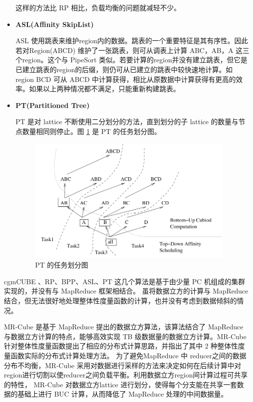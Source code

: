 \begin{itemize}
这样的方法比 RP 相比，负载均衡的问题就减轻不少。

\item \textbf{ASL(Affinity SkipList)}

ASL 使用跳表来维护region内的数据。跳表的一个重要特征是其有序性。因此若对Region(ABCD) 维护了一张跳表，则可从调表上计算 ABC，AB，A 这三个region。这个与 PipeSort 类似。若要计算的region并没有建立跳表，但它是已建立跳表的region的后缀，则仍可从已建立的跳表中较快速地计算。如region BCD 可从 ABCD 中计算获得，相比从原数据中计算获得有更高的效率。如果以上两种情况都不满足，只能重新构建跳表。
 
\item \textbf{PT(Partitioned Tree)}

PT 是对 lattice 不断使用二分划分的方法，直到划分的子 lattice 的数量与节点数量相同则停止。图 \ref{cluster_pt} 是 PT 的任务划分图。

\begin{figure}[!htb]
\centering\includegraphics[width=4in]{picture/ch_current_research/cluster_pt} 
\caption{PT 的任务划分图}\label{cluster_pt} 
\end{figure} 

\end{itemize}


cgmCUBE \cite{dehne2006cgmcube}、RP、BPP、ASL、PT \cite{ng2001iceberg} 这几个算法是基于由少量 PC 机组成的集群实现的，并没有与 MapReduce 框架相结合。 \cite{you2008parallel} \cite{sergey2009applying} \cite{lee2012efficient} 虽将数据立方的计算与 MapReduce结合，但无法很好地处理整体性度量函数的计算，也并没有考虑到数据倾斜的情况。

MR-Cube \cite{nandi2011distributed} 是基于 MapReduce 提出的数据立方算法，该算法结合了 MapReduce 与数据立方计算的特点，能够高效实现 TB 级数据量的数据立方计算。MR-Cube 针对整体性度量函数提出了相应的分布式计算思路，并指出了其中 2 种整体性度量函数实际的分布式计算处理方法。 为了避免MapReduce 中 reducer之间的数据分布不均衡，MR-Cube 采用对数据进行采样的方法来决定如何在后续计算中对region进行切割以使reducer之间负载平衡。利用数据立方region间计算过程可共享的特性， MR-Cube 对数据立方lattice 进行划分，使得每个分支能在共享一套数据的基础上进行 BUC 计算，从而降低了 MapReduce 处理的中间数据量。

